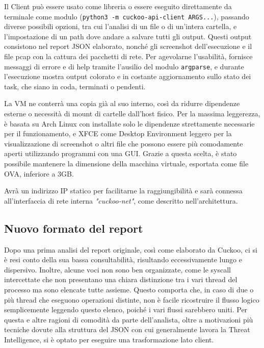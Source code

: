 Il Client può essere usato come libreria o essere eseguito direttamente da terminale come modulo (\texttt{python3 -m cuckoo-api-client ARGS...}), passando diverse possibili opzioni, tra cui l'analisi di un file o di un'intera cartella, e l'impostazione di un path dove andare a salvare tutti gli output.
Questi output consistono nel report JSON elaborato, nonché gli screenshot dell'esecuzione e il file pcap con la cattura dei pacchetti di rete.
Per agevolarne l'usabilità, fornisce messaggi di errore e di help tramite l'ausilio del modulo \texttt{argparse}, e durante l'esecuzione mostra output colorato e in costante aggiornamento sullo stato dei task, che siano in coda, terminati o pendenti.

La VM ne conterrà una copia già al suo interno, così da ridurre dipendenze esterne o necessità di mount di cartelle dall'host fisico. Per la massima leggerezza, è basata su Arch Linux con installate solo le dipendenze strettamente necessarie per il funzionamento, e XFCE come Desktop Environment leggero per la visualizzazione di screenshot o altri file che possono essere più comodamente aperti utilizzando programmi con una GUI. Grazie a questa scelta, è stato possibile mantenere la dimensione della macchina virtuale, esportata come file OVA, inferiore a 3GB.

Avrà un indirizzo IP statico per facilitarne la raggiungibilità e sarà connessa all'interfaccia di rete interna \emph{"cuckoo-net"}, come descritto nell'architettura.

\subsection{Nuovo formato del report}
\label{sez:dynamic-report-new-format}
Dopo una prima analisi del report originale, così come elaborato da Cuckoo, ci si è resi conto della sua bassa consultabilità, risultando eccessivamente lungo e dispersivo. Inoltre, alcune voci non sono ben organizzate, come le syscall intercettate che non presentano una chiara distinzione tra i vari thread del processo ma sono elencate tutte assieme. Questo comporta che, in caso di due o più thread che eseguono operazioni distinte, non è facile ricostruire il flusso logico semplicemente leggendo questo elenco, poiché i vari flussi sarebbero uniti.
Per questa e altre ragioni di comodità da parte dell'analista, oltre a motivazioni più tecniche dovute alla struttura del JSON con cui generalmente lavora la Threat Intelligence, si è optato per eseguire una trasformazione lato client.

